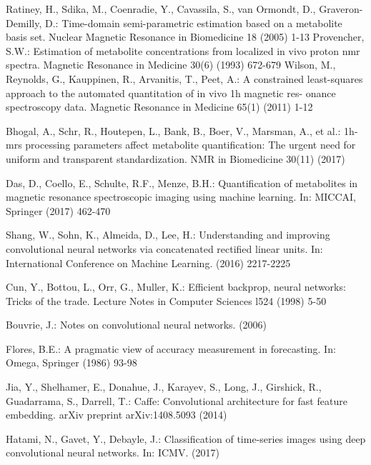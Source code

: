 \documentclass{llncs}
\begin{document}
\begin{thebibliography}{5}
Ratiney, H., Sdika, M., Coenradie, Y., Cavassila, S., van Ormondt, D., Graveron-
Demilly, D.: Time-domain semi-parametric estimation based on a metabolite basis
set. Nuclear Magnetic Resonance in Biomedicine 18 (2005) 1-13
Provencher, S.W.: Estimation of metabolite concentrations from localized in vivo
proton nmr spectra. Magnetic Resonance in Medicine 30(6) (1993) 672-679
Wilson, M., Reynolds, G., Kauppinen, R., Arvanitis, T., Peet, A.: A constrained
least-squares approach to the automated quantitation of in vivo 1h magnetic res-
onance spectroscopy data. Magnetic Resonance in Medicine 65(1) (2011) 1-12

Bhogal, A., Schr, R., Houtepen, L., Bank, B., Boer, V., Marsman, A., et al.: 1h-
mrs processing parameters affect metabolite quantification: The urgent need for
uniform and transparent standardization. NMR in Biomedicine 30(11) (2017)

Das, D., Coello, E., Schulte, R.F., Menze, B.H.: Quantification of metabolites in
magnetic resonance spectroscopic imaging using machine learning. In: MICCAI,
Springer (2017) 462-470

Shang, W., Sohn, K., Almeida, D., Lee, H.: Understanding and improving convolutional neural networks via concatenated rectified linear units. In: International
Conference on Machine Learning. (2016) 2217-2225

Cun, Y., Bottou, L., Orr, G., Muller, K.: Efficient backprop, neural networks:
Tricks of the trade. Lecture Notes in Computer Sciences l524 (1998) 5-50

Bouvrie, J.: Notes on convolutional neural networks. (2006)

Flores, B.E.: A pragmatic view of accuracy measurement in forecasting. In: Omega, Springer (1986) 93-98

Jia, Y., Shelhamer, E., Donahue, J., Karayev, S., Long, J., Girshick, R., Guadarrama, S., Darrell, T.: Caffe: Convolutional architecture for fast feature embedding.
arXiv preprint arXiv:1408.5093 (2014)


Hatami, N., Gavet, Y., Debayle, J.: Classification of time-series images using deep
convolutional neural networks. In: ICMV. (2017)

\end{thebibliography}
\end{document}
